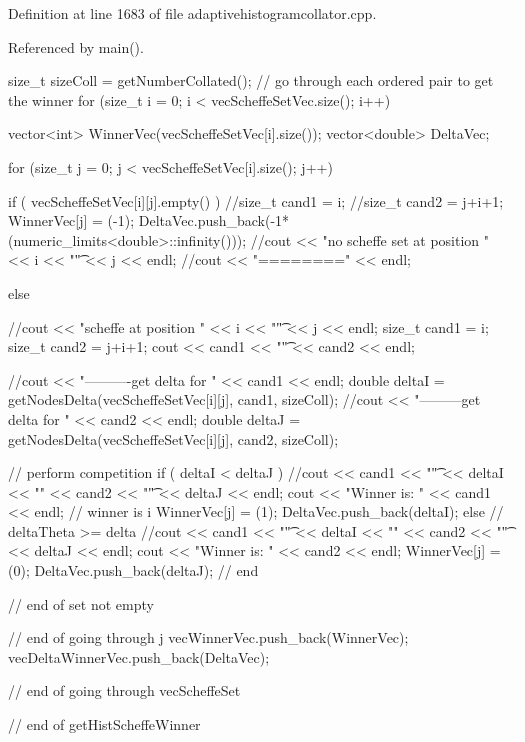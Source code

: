 \-Definition at line 1683 of file adaptivehistogramcollator.\-cpp.



\-Referenced by main().


\begin{DoxyCode}
{ 
  size_t sizeColl = getNumberCollated();
  // go through each ordered pair to get the winner
  for (size_t i = 0; i < vecScheffeSetVec.size(); i++) {
    
    vector<int> WinnerVec(vecScheffeSetVec[i].size());
    vector<double> DeltaVec;

    for (size_t j = 0; j < vecScheffeSetVec[i].size(); j++) {

      if ( vecScheffeSetVec[i][j].empty() ) {
        //size_t cand1 = i;
        //size_t cand2 = j+i+1;
        WinnerVec[j] = (-1);
        DeltaVec.push_back(-1*(numeric_limits<double>::infinity()));
        //cout << "no scheffe set at position " << i << "\t" << j << endl;
        //cout << "========" << endl;
      } 
    
      else {
        //cout << "scheffe at position " << i << "\t" << j << endl;
        size_t cand1 = i;
        size_t cand2 = j+i+1;
        cout << cand1 << "\t" << cand2 << endl;

        //cout << "----------get delta for " << cand1 << endl;
        double deltaI = getNodesDelta(vecScheffeSetVec[i][j], cand1, sizeColl);
        //cout << "---------get delta for " << cand2 << endl;
        double deltaJ = getNodesDelta(vecScheffeSetVec[i][j], cand2, sizeColl);

        // perform competition
        if ( deltaI < deltaJ ) {
          //cout << cand1 << "\t" << deltaI << "\n" << cand2 << "\t" << deltaJ
       << endl;
          cout << "Winner is: " << cand1 << endl;
          // winner is i
          WinnerVec[j] = (1);
          DeltaVec.push_back(deltaI);
        }
        else { // deltaTheta >= delta 
          //cout << cand1 << "\t" << deltaI << "\n" << cand2 << "\t" << deltaJ
       << endl;
          cout << "Winner is: " << cand2 << endl;
          WinnerVec[j] = (0);
          DeltaVec.push_back(deltaJ);
        }  // end
      } // end of set not empty
    } // end of going through j
    vecWinnerVec.push_back(WinnerVec);
    vecDeltaWinnerVec.push_back(DeltaVec);
  } // end of going through vecScheffeSet

} // end of getHistScheffeWinner
\end{DoxyCode}
